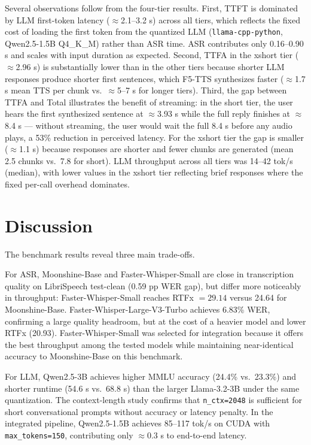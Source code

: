 \documentclass[12pt, a4paper]{article}
\begin{document}
Several observations follow from the four-tier results. First, TTFT is dominated by LLM first-token latency ($\approx$2.1--3.2 s) across all tiers, which reflects the fixed cost of loading the first token from the quantized LLM (\texttt{llama-cpp-python}, Qwen2.5-1.5B Q4\_K\_M) rather than ASR time. ASR contributes only 0.16--0.90 s and scales with input duration as expected. Second, TTFA in the xshort tier ($\approx$2.96 s) is substantially lower than in the other tiers because shorter LLM responses produce shorter first sentences, which F5-TTS synthesizes faster ($\approx$1.7 s mean TTS per chunk vs.\ $\approx$5--7 s for longer tiers). Third, the gap between TTFA and Total illustrates the benefit of streaming: in the short tier, the user hears the first synthesized sentence at $\approx$3.93 s while the full reply finishes at $\approx$8.4 s --- without streaming, the user would wait the full 8.4 s before any audio plays, a 53\% reduction in perceived latency. For the xshort tier the gap is smaller ($\approx$1.1 s) because responses are shorter and fewer chunks are generated (mean 2.5 chunks vs.\ 7.8 for short). LLM throughput across all tiers was 14--42 tok/s (median), with lower values in the xshort tier reflecting brief responses where the fixed per-call overhead dominates.

\section{Discussion}

The benchmark results reveal three main trade-offs.

For ASR, Moonshine-Base and Faster-Whisper-Small are close in transcription quality on LibriSpeech test-clean (0.59 pp WER gap), but differ more noticeably in throughput: Faster-Whisper-Small reaches RTFx $= 29.14$ versus 24.64 for Moonshine-Base. Faster-Whisper-Large-V3-Turbo achieves 6.83\% WER, confirming a large quality headroom, but at the cost of a heavier model and lower RTFx (20.93). Faster-Whisper-Small was selected for integration because it offers the best throughput among the tested models while maintaining near-identical accuracy to Moonshine-Base on this benchmark.

For LLM, Qwen2.5-3B achieves higher MMLU accuracy (24.4\% vs.\ 23.3\%) and shorter runtime (54.6 s vs.\ 68.8 s) than the larger Llama-3.2-3B under the same quantization. The context-length study confirms that \texttt{n\_ctx=2048} is sufficient for short conversational prompts without accuracy or latency penalty. In the integrated pipeline, Qwen2.5-1.5B achieves 85--117 tok/s on CUDA with \texttt{max\_tokens=150}, contributing only $\approx$0.3 s to end-to-end latency.
\end{document}
